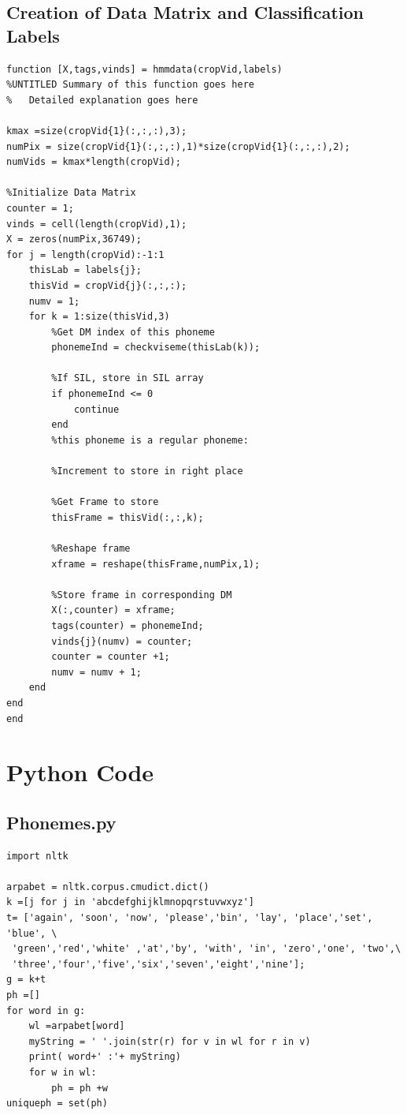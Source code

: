 \documentclass[a4paper]{article}
\begin{document}
\subsection{Creation of Data Matrix and Classification Labels}
\begin{lstlisting}[style=myMatlabstyle]
function [X,tags,vinds] = hmmdata(cropVid,labels)
%UNTITLED Summary of this function goes here
%   Detailed explanation goes here

kmax =size(cropVid{1}(:,:,:),3);
numPix = size(cropVid{1}(:,:,:),1)*size(cropVid{1}(:,:,:),2);
numVids = kmax*length(cropVid);

%Initialize Data Matrix
counter = 1;
vinds = cell(length(cropVid),1);
X = zeros(numPix,36749);
for j = length(cropVid):-1:1
    thisLab = labels{j};
    thisVid = cropVid{j}(:,:,:);
    numv = 1;
    for k = 1:size(thisVid,3)
        %Get DM index of this phoneme
        phonemeInd = checkviseme(thisLab(k));
        
        %If SIL, store in SIL array
        if phonemeInd <= 0
            continue
        end
        %this phoneme is a regular phoneme:
        
        %Increment to store in right place
        
        %Get Frame to store
        thisFrame = thisVid(:,:,k);
        
        %Reshape frame
        xframe = reshape(thisFrame,numPix,1);
        
        %Store frame in corresponding DM
        X(:,counter) = xframe;
        tags(counter) = phonemeInd;
        vinds{j}(numv) = counter;
        counter = counter +1;
        numv = numv + 1;
    end
end
end
\end{lstlisting}



\section{Python Code}

\subsection{Phonemes.py}
\label{Ph.py}
\begin{lstlisting}[style=myPythonstyle]
import nltk

arpabet = nltk.corpus.cmudict.dict()
k =[j for j in 'abcdefghijklmnopqrstuvwxyz']
t= ['again', 'soon', 'now', 'please','bin', 'lay', 'place','set', 'blue', \
 'green','red','white' ,'at','by', 'with', 'in', 'zero','one', 'two',\
 'three','four','five','six','seven','eight','nine'];
g = k+t
ph =[]
for word in g:
	wl =arpabet[word]
	myString = ' '.join(str(r) for v in wl for r in v)
	print( word+' :'+ myString)
	for w in wl:
		ph = ph +w
uniqueph = set(ph)
\end{lstlisting}
\end{document}
